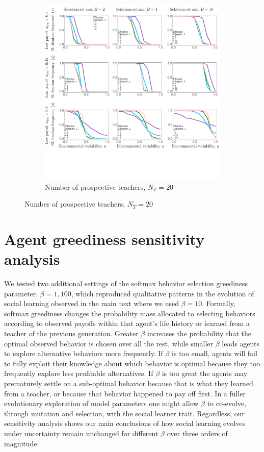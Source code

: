 \documentclass[letterpaper,11.5pt]{scrartcl}
\begin{document}
\begin{figure}
  \ContinuedFloat
  \begin{subfigure}{\textwidth}
	\caption{Number of prospective teachers, $N_T = 20$}
	\includegraphics[width=\textwidth]{Figures/supplement/nteachers=20/mainResultsPlots.pdf}
  \end{subfigure}
\end{figure}

\clearpage


\section{Agent greediness sensitivity analysis} 

We tested two additional settings of the softmax behavior selection greediness parameter,
$\beta=1,100$, which reproduced qualitative patterns in the evolution of social learning
observed in the main text where we used $\beta=10$.  
Formally, softmax greediness changes the 
probability mass allocated to selecting behaviors according to observed payoffs within that agent's
life history or learned from a teacher of the previous generation. 
Greater $\beta$ increases the probability that the optimal
observed behavior is chosen over all the rest, while smaller $\beta$ leads agents to explore alternative behaviors more frequently. If $\beta$ is too small, agents will fail to
fully exploit their knowledge about which behavior is optimal because they too frequently
explore less profitable alternatives.  If $\beta$ is too great the agents may prematurely
settle on a sub-optimal behavior because that is what they learned from a teacher, 
or because that behavior happened to pay off first. In a fuller evolutionary
exploration of model parameters one might allow $\beta$ to co-evolve, through
mutation and selection, with the social learner trait.  
Regardless, our sensitivity analysis shows our main conclusions of how social learning evolves under uncertainty remain unchanged for different $\beta$ over three orders of magnitude.
\end{document}
